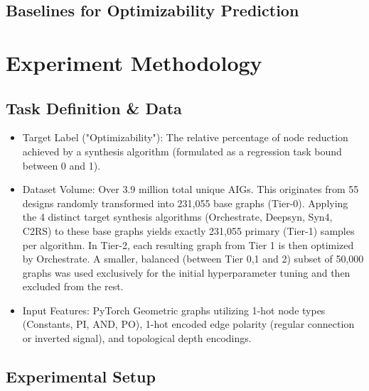 \documentclass[paper=a4, fontsize=11pt]{scrartcl} %
\numberwithin{equation}{section} %
\numberwithin{figure}{section} %
\numberwithin{table}{section} %
\begin{document}
\subsection{Baselines for Optimizability Prediction}

\section{Experiment Methodology}

\subsection{Task Definition \& Data}


\begin{itemize}
    \item Target Label ("Optimizability"): The relative percentage of node reduction achieved by a synthesis algorithm (formulated as a regression task bound between 0 and 1).
    \item Dataset Volume: Over 3.9 million total unique AIGs. This originates from 55 designs randomly transformed into 231,055  base graphs (Tier-0). Applying the 4 distinct target synthesis algorithms (Orchestrate, Deepsyn, Syn4, C2RS) to these base graphs yields exactly 231,055 primary (Tier-1) samples per algorithm. In Tier-2, each resulting graph from Tier 1 is then optimized by Orchestrate. A smaller, balanced (between Tier 0,1 and 2) subset of 50,000 graphs was used exclusively for the initial hyperparameter tuning and then excluded from the rest.
    \item Input Features: PyTorch Geometric graphs utilizing 1-hot node types (Constants, PI, AND, PO), 1-hot encoded edge polarity (regular connection or inverted signal), and topological depth encodings.
\end{itemize}


\subsection{Experimental Setup}
\end{document}
